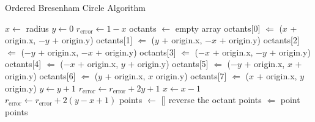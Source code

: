 \documentclass{sig-alternate}
\begin{document}
		\begin{algorithm}[htp!]
			\caption{Ordered Bresenham Circle Algorithm}
			\begin{algorithmic}
					\State $x \gets$ radius
					\State $y \gets 0$
					\State $r_{\text{error}} \gets 1 - x$
					\State octants $\gets$ empty array
						\State octants[0] $\Leftarrow$ ($x$ + origin.x, $-y$ + origin.y)
						\State octants[1] $\Leftarrow$ ($y$ + origin.x, $-x$ + origin.y)
						\State octants[2] $\Leftarrow$ ($-y$ + origin.x, $-x$ + origin.y)
						\State octants[3] $\Leftarrow$ ($-x$ + origin.x, $-y$ + origin.y)
						\State octants[4] $\Leftarrow$ ($-x$ + origin.x, $y$ + origin.y)
						\State octants[5] $\Leftarrow$ ($-y$ + origin.x, $x$ + origin.y)
						\State octants[6] $\Leftarrow$ ($y$ + origin.x, $x$ origin.y)
						\State octants[7] $\Leftarrow$ ($x$ + origin.x, $y$ origin.y)
						\State $y \gets y + 1$
							\State $r_{\text{error}} \gets r_{\text{error}} + 2y + 1$
						\Else
							\State $x \gets x - 1$
							\State $r_{\text{error}} \gets r_{\text{error}} + 2(y - x + 1)$
						\EndIf
					\EndWhile
					\State points $\gets$ []
							\State reverse the octant
						\EndIf
							\State points $\Leftarrow$ point
						\EndFor
					\EndFor
					\State \Return points
				\EndProcedure
			\end{algorithmic}
		\end{algorithm}

\end{document}

